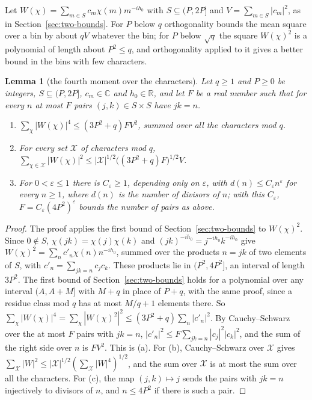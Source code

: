 \documentclass[11pt]{article}
\newtheorem{lemma}[theorem]{Lemma}
\theoremstyle{definition}
\begin{document}
Let $W(\chi) = \sum_{m \in S} c_m \chi(m) m^{-ih_0}$ with $S \subseteq (P, 2P]$ and $V = \sum_{m \in S} |c_m|^2$, as
in Section~\ref{sec:two-bounds}. For $P$ below $q$ orthogonality bounds the mean square over a bin by about $qV$
whatever the bin; for $P$ below $\sqrt q$ the square $W(\chi)^2$ is a polynomial of length about $P^2 \le q$, and
orthogonality applied to it gives a better bound in the bins with few characters.

\begin{lemma}[the fourth moment over the characters]\label{lem:fourth}
Let $q \ge 1$ and $P \ge 0$ be integers, $S \subseteq (P, 2P]$, $c_m \in \mathbb C$ and $h_0 \in \mathbb R$, and let
$F$ be a real number such that for every $n$ at most $F$ pairs $(j, k) \in S \times S$ have $jk = n$.
\begin{enumerate}
\item[(a)] $\sum_\chi |W(\chi)|^4 \le (3P^2 + q) F V^2$, summed over all the characters mod $q$.
\item[(b)] For every set $\mathcal X$ of characters mod $q$, $\sum_{\chi \in \mathcal X} |W(\chi)|^2 \le |\mathcal
  X|^{1/2} \bigl((3P^2 + q) F\bigr)^{1/2} V$.
\item[(c)] For $0 < \varepsilon \le 1$ there is $C_\varepsilon \ge 1$, depending only on $\varepsilon$, with $d(n) \le
  C_\varepsilon n^\varepsilon$ for every $n \ge 1$, where $d(n)$ is the number of divisors of $n$; with this
  $C_\varepsilon$, $F = C_\varepsilon (4P^2)^\varepsilon$ bounds the number of pairs as above.
\end{enumerate}
\end{lemma}

\begin{proof}
The proof applies the first bound of Section~\ref{sec:two-bounds} to $W(\chi)^2$. Since $0 \notin S$, $\chi(jk) =
\chi(j)\chi(k)$ and $(jk)^{-ih_0} = j^{-ih_0} k^{-ih_0}$ give $W(\chi)^2 = \sum_n c'_n \chi(n) n^{-ih_0}$, summed over
the products $n = jk$ of two elements of $S$, with $c'_n = \sum_{jk = n} c_j c_k$. These products lie in $(P^2, 4P^2]$,
an interval of length $3P^2$. The first bound of Section~\ref{sec:two-bounds} holds for a polynomial over any interval
$(A, A + M]$ with $M + q$ in place of $P + q$, with the same proof, since a residue class mod $q$ has at most $M/q + 1$
elements there. So $\sum_\chi |W(\chi)|^4 = \sum_\chi |W(\chi)^2|^2 \le (3P^2 + q) \sum_n |c'_n|^2$. By Cauchy--Schwarz
over the at most $F$ pairs with $jk = n$, $|c'_n|^2 \le F \sum_{jk = n} |c_j|^2 |c_k|^2$, and the sum of the right side
over $n$ is $F V^2$. This is (a). For (b), Cauchy--Schwarz over $\mathcal X$ gives $\sum_{\mathcal X} |W|^2 \le
|\mathcal
X|^{1/2} (\sum_{\mathcal X} |W|^4)^{1/2}$, and the sum over $\mathcal X$ is at most the sum over all the characters. For
(c), the map $(j, k) \mapsto j$ sends the pairs with $jk = n$ injectively to divisors of $n$, and $n \le 4P^2$ if there
is such a pair.
\end{proof}
\end{document}
